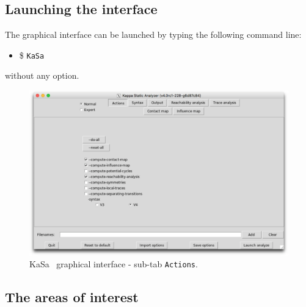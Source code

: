 \documentclass[11pt]{book}
\def\KaSa{\textsf{KaSa}}
\def\ttt#1{\texttt{#1}}
\def\ITE#1{\begin{itemize}#1\end{itemize}}
\begin{document}
\subsection{Launching the interface}

The graphical interface can be launched by typing the following command line:
\ITE{\item[\$] \ttt{KaSa}}

without any option.

\begin{figure}[htbp]
\centering
\includegraphics[width=12cm]{img/kasa_0.png}
\caption{\KaSa~ graphical interface - sub-tab \texttt{Actions}.}
\label{fig:kasa:0}
\end{figure}

\subsection{The areas of interest}
\end{document}
